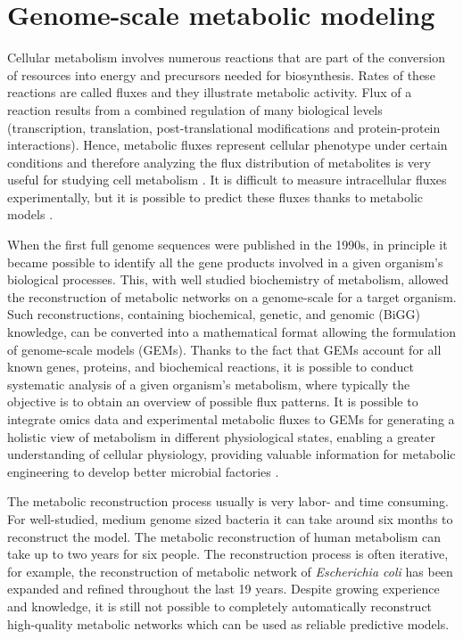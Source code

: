 \section{Genome-scale metabolic modeling} %

Cellular metabolism involves numerous reactions that are part of the conversion of resources into energy and precursors needed for 
biosynthesis. Rates of these reactions are called fluxes and they illustrate metabolic activity. Flux of a reaction results from a combined regulation of many biological levels (transcription, translation, post-translational modifications and protein-protein interactions). \cite{Nidelet2016} Hence, metabolic fluxes represent cellular phenotype under certain conditions and therefore analyzing the flux distribution of metabolites is very useful for studying cell metabolism \cite{Nielsen2003}. It is difficult to measure intracellular fluxes experimentally, but it is possible to predict these fluxes thanks to metabolic models \cite{Nidelet2016}.

When the first full genome sequences were published in the 1990s, in principle it became possible to identify all the gene products involved in a given organism's biological processes. This, with well studied biochemistry of metabolism, allowed the reconstruction of metabolic networks on a genome-scale for a target organism. Such reconstructions, containing biochemical, genetic, and genomic (BiGG) knowledge, can be converted into a mathematical format allowing the formulation of genome-scale models (GEMs). \cite{Palsson2009} Thanks to the fact that GEMs account for all known genes, proteins, and biochemical reactions, it is possible to conduct systematic analysis of a given organism's metabolism, where typically the objective is to obtain an overview of possible flux patterns. %
It is possible to integrate omics data and experimental metabolic fluxes to GEMs for generating a holistic view of metabolism in different physiological states, enabling a greater understanding of cellular physiology, providing valuable information for metabolic engineering to develop better microbial factories \cite{Kerkhoven2022}. 

The metabolic reconstruction process usually is very labor- and time consuming. For well-studied, medium genome sized bacteria it can take around six months to reconstruct the model. 
The metabolic reconstruction of human metabolism can take up to two years for six people. The reconstruction process is often iterative, for example, the reconstruction of metabolic 
network of \textit{Escherichia coli} has been expanded and refined throughout the last 19 years. Despite growing experience and 
knowledge, it is still not possible to completely automatically reconstruct high-quality metabolic networks which can be used as reliable predictive models. \cite{Thiele2010} 

